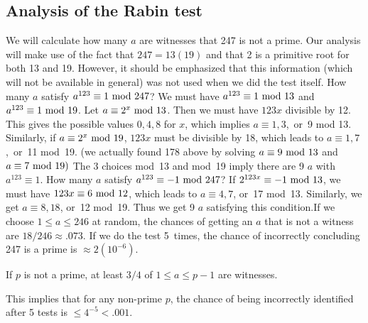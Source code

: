 \subsection{Analysis of the Rabin test}
We will calculate how many $a$ are witnesses that 247 is not a prime.  Our
analysis will make use of the fact that $247=13(19)$ and that 2 is a
primitive root for both 13 and 19.  However, it should be emphasized that
this information (which will not be available in general) was not used
when we did the test itself.
\pq How many $a$ satisfy $a^{123}\equiv1\hbox{ mod }247$?  We must have 
$a^{123}\equiv1\hbox{ mod }13$
and $a^{123}\equiv1\hbox{ mod }19$.  Let $a\equiv2^x\hbox{ mod }13$.  Then we must have $123x$
divisible by 12.  This gives the possible values $0,4,8$ for $x$, which
implies $a\equiv1,3$,~or~9 mod 13.  Similarly, if $a\equiv2^x\hbox{ mod }19$, $123x$
must be divisible by 18, which leads to $a\equiv1,7$,~or~11 mod~19.  (we
actually found 178 above by solving $a\equiv9\hbox{ mod }13$ and $a\equiv7\hbox{ mod }19)$
The 3 choices mod~13 and mod~19 imply there are 9 $a$ with $a^{123}\equiv1$.
\pq How many $a$ satisfy $a^{123}\equiv-1\hbox{ mod }247$? If $2^{123x}\equiv-1\hbox{ mod }13$,
we must have $123x\equiv6\hbox{ mod }12$, which leads to $a\equiv4,7$, or~17 mod~13.
Similarly, we get $a\equiv8,18$, or~12 mod~19.  Thus we get 9 $a$ satisfying
this condition.\pq If we choose $1\le a\le246$ at random, the chances of
getting an $a$ that is not a witness are $18/246\approx.073$.  If we do the
test 5~times, the chance of incorrectly concluding 247 is a prime is 
$\approx2(10^{-6})$.
\begin{Th}[Rabin]If $p$ is not a prime, at least $3/4$
of $1\le a\le p-1$ are witnesses.\end{Th}
This implies that for any non-prime $p$, the chance of being incorrectly
identified after 5 tests is $\le4^{-5}<.001$.
